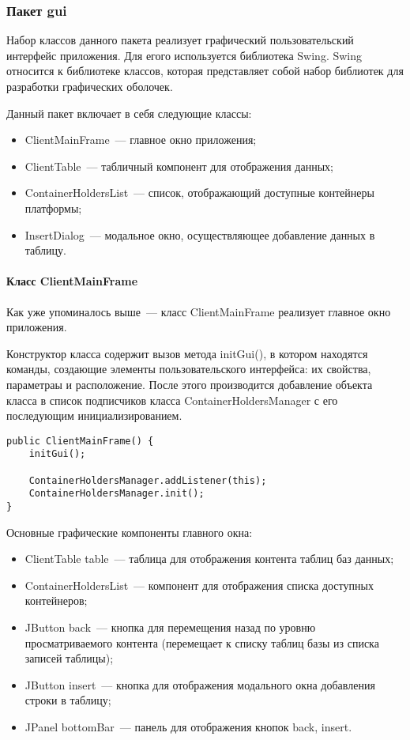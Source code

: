 \subsubsection{Пакет gui}
Набор классов данного пакета реализует графический пользовательский интерфейс приложения. Для егого используется библиотека Swing. Swing относится к библиотеке классов, которая представляет собой набор библиотек для разработки графических оболочек.

Данный пакет включает в себя следующие классы:
\begin{itemize}
\item ClientMainFrame~--- главное окно приложения;
\item ClientTable~--- табличный компонент для отображения данных;
\item ContainerHoldersList~--- список, отображающий доступные контейнеры платформы;
\item InsertDialog~--- модальное окно, осуществляющее добавление данных в таблицу.
\end{itemize}

\paragraph{Класс ClientMainFrame}
Как уже упоминалось выше~--- класс ClientMainFrame реализует главное окно приложения.

Конструктор класса содержит вызов метода initGui(), в котором находятся команды, создающие элементы пользовательского интерфейса: их свойства, параметраы и расположение. После этого производится добавление объекта класса в список подписчиков класса ContainerHoldersManager с его последующим инициализированием.
\begin{verbatim}
public ClientMainFrame() {
    initGui();

    ContainerHoldersManager.addListener(this);
    ContainerHoldersManager.init();
}
\end{verbatim}

Основные графические компоненты главного окна:
\begin{itemize}
\item ClientTable table~--- таблица для отображения контента таблиц баз данных;
\item ContainerHoldersList~--- компонент для отображения списка доступных контейнеров;
\item JButton back~--- кнопка для перемещения назад по уровню просматриваемого контента (перемещает к списку таблиц базы из списка записей таблицы);
\item JButton insert~--- кнопка для отображения модального окна добавления строки в таблицу;
\item JPanel bottomBar~--- панель для отображения кнопок back, insert.
\end{itemize}

